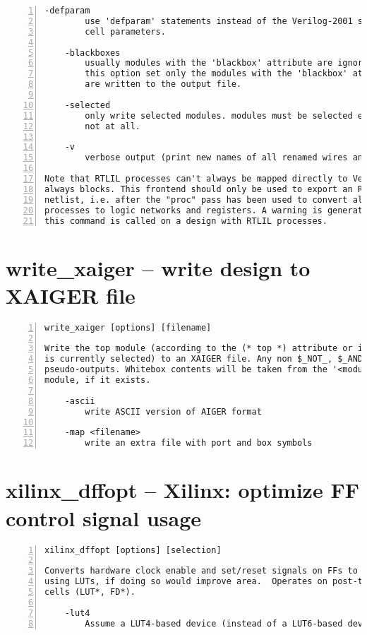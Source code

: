 \begin{lstlisting}[numbers=left,frame=single]
    -defparam
        use 'defparam' statements instead of the Verilog-2001 syntax for
        cell parameters.

    -blackboxes
        usually modules with the 'blackbox' attribute are ignored. with
        this option set only the modules with the 'blackbox' attribute
        are written to the output file.

    -selected
        only write selected modules. modules must be selected entirely or
        not at all.

    -v
        verbose output (print new names of all renamed wires and cells)

Note that RTLIL processes can't always be mapped directly to Verilog
always blocks. This frontend should only be used to export an RTLIL
netlist, i.e. after the "proc" pass has been used to convert all
processes to logic networks and registers. A warning is generated when
this command is called on a design with RTLIL processes.
\end{lstlisting}

\section{write\_xaiger -- write design to XAIGER file}
\label{cmd:write_xaiger}
\begin{lstlisting}[numbers=left,frame=single]
    write_xaiger [options] [filename]

Write the top module (according to the (* top *) attribute or if only one module
is currently selected) to an XAIGER file. Any non $_NOT_, $_AND_, $_ABC9_FF_, ornon (* abc9_box_id *) cells will be converted into psuedo-inputs and
pseudo-outputs. Whitebox contents will be taken from the '<module-name>$holes'
module, if it exists.

    -ascii
        write ASCII version of AIGER format

    -map <filename>
        write an extra file with port and box symbols
\end{lstlisting}

\section{xilinx\_dffopt -- Xilinx: optimize FF control signal usage}
\label{cmd:xilinx_dffopt}
\begin{lstlisting}[numbers=left,frame=single]
    xilinx_dffopt [options] [selection]

Converts hardware clock enable and set/reset signals on FFs to emulation
using LUTs, if doing so would improve area.  Operates on post-techmap Xilinx
cells (LUT*, FD*).

    -lut4
        Assume a LUT4-based device (instead of a LUT6-based device).
\end{lstlisting}

